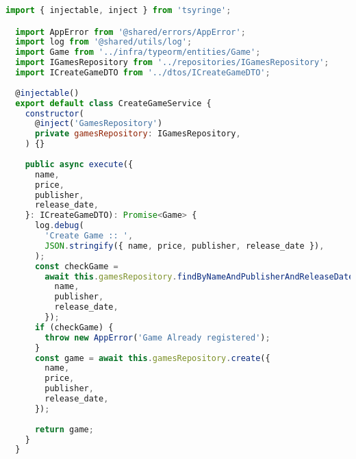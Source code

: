 \begin{lstlisting}[language=JavaScript, caption={CreateGameService.ts},captionpos=b, label=alg:creategameservice]
  import { injectable, inject } from 'tsyringe';

  import AppError from '@shared/errors/AppError';
  import log from '@shared/utils/log';
  import Game from '../infra/typeorm/entities/Game';
  import IGamesRepository from '../repositories/IGamesRepository';
  import ICreateGameDTO from '../dtos/ICreateGameDTO';
  
  @injectable()
  export default class CreateGameService {
    constructor(
      @inject('GamesRepository')
      private gamesRepository: IGamesRepository,
    ) {}
  
    public async execute({
      name,
      price,
      publisher,
      release_date,
    }: ICreateGameDTO): Promise<Game> {
      log.debug(
        'Create Game :: ',
        JSON.stringify({ name, price, publisher, release_date }),
      );
      const checkGame =
        await this.gamesRepository.findByNameAndPublisherAndReleaseDate({
          name,
          publisher,
          release_date,
        });
      if (checkGame) {
        throw new AppError('Game Already registered');
      }
      const game = await this.gamesRepository.create({
        name,
        price,
        publisher,
        release_date,
      });
  
      return game;
    }
  }
  
  \end{lstlisting}
  